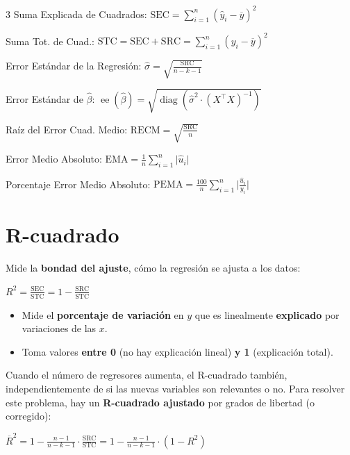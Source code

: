 \documentclass[10pt, a4paper, landscape]{article}
\DeclareMathOperator{\se}{ee}
\DeclareMathOperator{\diag}{diag}
\newcommand{\SSR}{\text{SRC}}
\newcommand{\SSE}{\text{SEC}}
\newcommand{\SST}{\text{STC}}
\begin{document}
\begin{multicols}{3}
Suma Explicada de Cuadrados: \hfill \( \SSE = \sum_{i = 1}^{n} (\hat{y}_{i} - \overline{y})^{2} \)

Suma Tot. de Cuad.: \hfill \( \SST = \SSE + \SSR = \sum_{i = 1}^{n} (y_{i} - \overline{y})^{2} \)

Error Estándar de la Regresión: \hfill \( \hat{\sigma} = \sqrt{\frac{\SSR}{n - k - 1}} \)

Error Estándar de \( \hat{\beta} \): \hfill \( \se(\hat{\beta}) = \sqrt{ \diag ( \hat{\sigma}^{2} \cdot (X^{\top} X)^{-1} ) } \)

Raíz del Error Cuad. Medio: \hfill \( \text{RECM} = \sqrt{\frac{\SSR}{n}} \)

Error Medio Absoluto: \hfill \( \text{EMA} = \frac{1}{n} \sum_{i = 1}^{n} \lvert \hat{u}_{i} \rvert \)

Porcentaje Error Medio Absoluto: \hfill \( \text{PEMA} = \frac{100}{n} \sum_{i = 1}^{n} \lvert \frac{\hat{u}_{i}}{y_{i}} \rvert \)

\columnbreak

\section*{R-cuadrado}

Mide la \textbf{bondad del ajuste}, cómo la regresión se ajusta a los datos:

\begin{center}
	\( R^{2} = \frac{\SSE}{\SST} = 1 - \frac{\SSR}{\SST} \)
\end{center}

\begin{itemize}[leftmargin=*]
	\item Mide el \textbf{porcentaje de variación} en \( y \) que es linealmente \textbf{explicado} por variaciones de las \( x \).
	\item Toma valores \textbf{entre 0} (no hay explicación lineal) \textbf{y 1} (explicación total).
\end{itemize}

Cuando el número de regresores aumenta, el R-cuadrado también, independientemente de si las nuevas variables son relevantes o no. Para resolver este problema, hay un \textbf{R-cuadrado ajustado} por grados de libertad (o corregido):

\begin{center}
	\( \overline{R}^{2} = 1 - \frac{n - 1}{n - k - 1} \cdot \frac{\SSR}{\SST} = 1 - \frac{n - 1}{n - k - 1} \cdot (1 - R^{2}) \)
\end{center}


\end{multicols}
\end{document}
